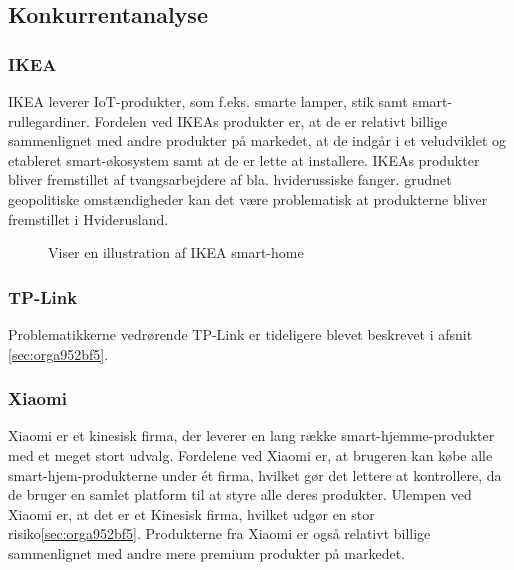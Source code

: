 \documentclass[11pt]{article}
\begin{document}
\subsection{Konkurrentanalyse}
\subsubsection{IKEA}
IKEA leverer IoT-produkter, som f.eks. smarte lamper, stik samt smart-rullegardiner. Fordelen ved IKEAs produkter er, at de er relativt billige sammenlignet med andre produkter på markedet, at de indgår i et veludviklet og etableret smart-økosystem samt at de er lette at installere.
IKEAs produkter bliver fremstillet af tvangsarbejdere af bla. hviderussiske fanger.  grudnet geopolitiske omstændigheder kan det være problematisk at produkterne bliver fremstillet i Hviderusland.
\begin{figure}[htbp]
\centering
{}
\caption{Viser en illustration af IKEA smart-home}
\end{figure}
\subsubsection{TP-Link}
Problematikkerne vedrørende TP-Link er tideligere blevet beskrevet i afsnit \ref{sec:orga952bf5}.
\subsubsection{Xiaomi}
Xiaomi er et kinesisk firma, der leverer en lang række smart-hjemme-produkter med et meget stort udvalg. Fordelene ved Xiaomi er, at brugeren kan købe alle smart-hjem-produkterne under ét firma, hvilket gør det lettere at kontrollere, da de bruger en samlet platform til at styre alle deres produkter. Ulempen ved Xiaomi er, at det er et Kinesisk firma, hvilket udgør en stor risiko\ref{sec:orga952bf5}. Produkterne fra Xiaomi er også relativt billige sammenlignet med andre mere premium produkter på markedet.
\end{document}
